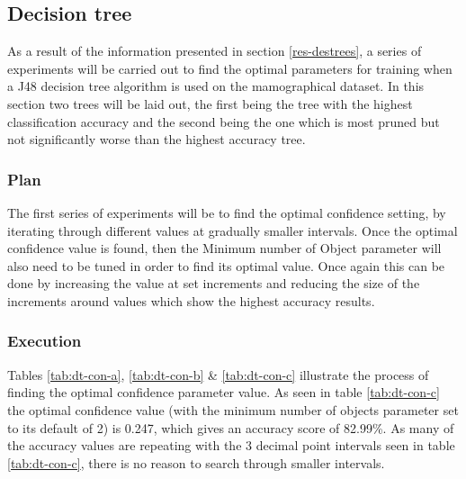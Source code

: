 \documentclass[12pt]{article}
\begin{document}
  \subsection{Decision tree}
    As a result of the information presented in section \ref{res-destrees}, a series of experiments will be carried out to find the optimal parameters for training when a J48 decision tree algorithm is used on the mamographical dataset. In this section two trees will be laid out, the first being the tree with the highest classification accuracy and the second being the one which is most pruned but not significantly worse than the highest accuracy tree.

    \subsubsection{Plan}
      The first series of experiments will be to find the optimal confidence setting, by iterating through different values at gradually smaller intervals. Once the optimal confidence value is found, then the Minimum number of Object parameter will also need to be tuned in order to find its optimal value. Once again this can be done by increasing the value at set increments and reducing the size of the increments around values which show the highest accuracy results.

    \subsubsection{Execution} \label{dt-execution}
      Tables \ref{tab:dt-con-a}, \ref{tab:dt-con-b} \& \ref{tab:dt-con-c} illustrate the process of finding the optimal confidence parameter value. As seen in table \ref{tab:dt-con-c} the optimal confidence value (with the minimum number of objects parameter set to its default of 2) is 0.247, which gives an accuracy score of 82.99\%. As many of the accuracy values are repeating with the 3 decimal point intervals seen in table \ref{tab:dt-con-c}, there is no reason to search through smaller intervals.
\end{document}
